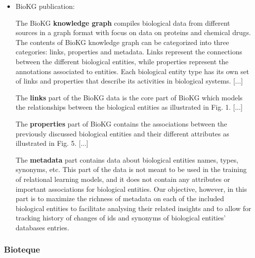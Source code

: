 \documentclass{article}
\begin{document}
\begin{itemize}

\item BioKG publication:
\begin{displayquote}
The BioKG \textbf{knowledge graph} compiles biological data from different sources in a graph format with focus on data on proteins and chemical drugs. The contents of BioKG knowledge graph can be categorized into three categories: links, properties and metadata. Links represent the connections between the different biological entities, while properties represent the annotations associated to entities. Each biological entity type has its own set of links and properties that describe its activities in biological systems.
[...]

The \textbf{links} part of the BioKG data is the core part of BioKG which models the relationships between the biological entities as illustrated in Fig. 1.
[...]

The \textbf{properties} part of BioKG contains the associations between the previously discussed biological entities and their different attributes as illustrated in Fig. 5.
[...]

The \textbf{metadata} part contains data about biological entities names, types, synonyms, etc. This part of the data is not meant to be used in the training of relational learning models, and it does not contain any attributes or important associations for biological entities. Our objective, however, in this part is to maximize the richness of metadata on each of the included biological entities to facilitate analysing their related insights and to allow for tracking history of changes of ids and synonyms of biological entities’ databases entries.
\end{displayquote}

\end{itemize}

\subsubsection{Bioteque}
\end{document}
